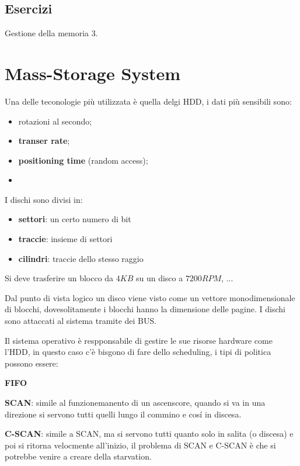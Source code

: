 \documentclass[12pt]{article}
\begin{document}
\subsection{Esercizi}
Gestione della memoria 3.









\newpage
\section{Mass-Storage System}
Una delle teconologie pi\`u utilizzata \`e quella delgi HDD, i dati pi\`u sensibili sono:
\begin{itemize}
  \item rotazioni al secondo;
  \item \textbf{transer rate};
  \item \textbf{positioning time} (random access);
  \item 
\end{itemize}
I dischi sono divisi in:
\begin{itemize}
  \item \textbf{settori}: un certo numero di bit
  \item \textbf{traccie}: insieme di settori
  \item \textbf{cilindri}: traccie dello stesso raggio
\end{itemize}
\begin{example}{}{}
  Si deve trasferire un blocco da $4KB$ su un disco a $7200RPM$, ...
\end{example}
Dal punto di vista logico un disco viene visto come un vettore monodimensionale di blocchi, dovesolitamente i blocchi hanno la dimensione delle pagine. I dischi sono attaccati al sistema tramite dei BUS.

Il sistema operativo \`e respponsabile di gestire le sue risorse hardware come l'HDD, in questo caso c'\`e bisgono di fare dello scheduling, i tipi di politica possono essere:

\textbf{FIFO} 

\textbf{SCAN}: simile al funzionemanento di un ascenscore, quando si va in una direzione si servono tutti quelli lungo il commino e cos\'i in discesa.

\textbf{C-SCAN}: simile a SCAN, ma si servono tutti quanto solo in salita (o discesa) e poi si ritorna velocmente all'inizio, il problema di SCAN e C-SCAN \`e che si potrebbe venire a creare della starvation.
\end{document}
